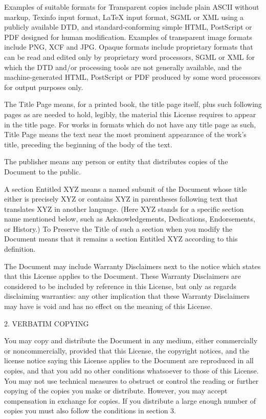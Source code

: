 Examples of suitable formats for Transparent copies include plain
ASCII without markup, Texinfo input format, LaTeX input format,
SGML or XML using a publicly available DTD, and standard-conforming
simple HTML, PostScript or PDF designed for human modification. Examples
of transparent image formats include PNG, XCF and JPG. Opaque formats
include proprietary formats that can be read and edited only by proprietary
word processors, SGML or XML for which the DTD and/or processing tools
are not generally available, and the machine-generated HTML, PostScript
or PDF produced by some word processors for output purposes only.

The \textquotedbl{}Title Page\textquotedbl{} means, for a printed
book, the title page itself, plus such following pages as are needed
to hold, legibly, the material this License requires to appear in
the title page. For works in formats which do not have any title page
as such, \textquotedbl{}Title Page\textquotedbl{} means the text near
the most prominent appearance of the work's title, preceding the beginning
of the body of the text.

The \textquotedbl{}publisher\textquotedbl{} means any person or entity
that distributes copies of the Document to the public.

A section \textquotedbl{}Entitled XYZ\textquotedbl{} means a named
subunit of the Document whose title either is precisely XYZ or contains
XYZ in parentheses following text that translates XYZ in another language.
(Here XYZ stands for a specific section name mentioned below, such
as \textquotedbl{}Acknowledgements\textquotedbl{}, \textquotedbl{}Dedications\textquotedbl{},
\textquotedbl{}Endorsements\textquotedbl{}, or \textquotedbl{}History\textquotedbl{}.)
To \textquotedbl{}Preserve the Title\textquotedbl{} of such a section
when you modify the Document means that it remains a section \textquotedbl{}Entitled
XYZ\textquotedbl{} according to this definition.

The Document may include Warranty Disclaimers next to the notice which
states that this License applies to the Document. These Warranty Disclaimers
are considered to be included by reference in this License, but only
as regards disclaiming warranties: any other implication that these
Warranty Disclaimers may have is void and has no effect on the meaning
of this License.

2. VERBATIM COPYING

You may copy and distribute the Document in any medium, either commercially
or noncommercially, provided that this License, the copyright notices,
and the license notice saying this License applies to the Document
are reproduced in all copies, and that you add no other conditions
whatsoever to those of this License. You may not use technical measures
to obstruct or control the reading or further copying of the copies
you make or distribute. However, you may accept compensation in exchange
for copies. If you distribute a large enough number of copies you
must also follow the conditions in section 3.

